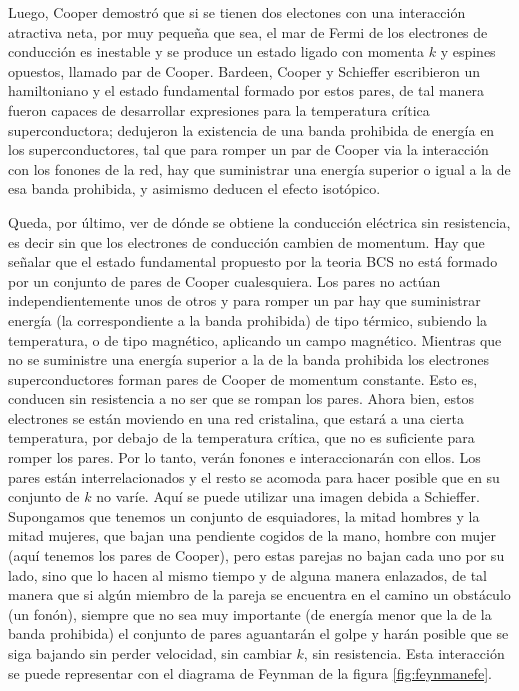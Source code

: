 Luego, Cooper demostró que si se tienen dos electones con una interacción atractiva neta, por muy pequeña que sea, el mar de Fermi de los electrones de conducción es inestable y se produce un estado ligado con momenta $k$ y espines opuestos, llamado par de Cooper. Bardeen, Cooper y Schieffer escribieron un hamiltoniano y el estado fundamental formado por estos pares, de tal manera fueron capaces de desarrollar expresiones para la temperatura crítica superconductora; dedujeron la existencia de una banda prohibida de energía en los superconductores, tal que para romper un par de Cooper via la interacción con los fonones de la red, hay que suministrar una energía superior o igual a la de esa banda prohibida, y asimismo deducen el efecto isotópico.

Queda, por último, ver de dónde se obtiene la conducción eléctrica sin resistencia, es decir sin que los electrones de conducción cambien de momentum. Hay que señalar que el estado fundamental propuesto por la teoria BCS no está formado por un conjunto de pares de Cooper cualesquiera. Los pares no actúan independientemente unos de otros y para romper un par hay que suministrar energía (la correspondiente a la banda prohibida) de tipo térmico, subiendo la temperatura, o de tipo magnético, aplicando un campo magnético. Mientras que no se suministre una energía superior a la de la banda prohibida los electrones superconductores forman pares de Cooper de momentum constante. Esto es, conducen sin resistencia a no ser que se rompan los pares. Ahora bien, estos electrones se están moviendo en una red cristalina, que estará a una cierta temperatura, por debajo de la temperatura crítica, que no es suficiente para romper los pares. Por lo tanto, verán fonones e interaccionarán con ellos. Los pares están interrelacionados y el resto se acomoda para hacer posible que en su conjunto de $k$ no varíe. Aquí se puede utilizar una imagen debida a Schieffer. Supongamos que tenemos un conjunto de esquiadores, la mitad hombres y la mitad mujeres, que bajan una pendiente cogidos de la mano, hombre con mujer (aquí tenemos los pares de Cooper), pero estas parejas no bajan cada uno por su lado, sino que lo hacen al mismo tiempo y de alguna manera enlazados, de tal manera que si algún miembro de la pareja se encuentra en el camino un obstáculo (un fonón), siempre que no sea muy importante (de energía menor que la de la banda prohibida) el conjunto de pares aguantarán el golpe y harán posible que se siga bajando sin perder velocidad, sin cambiar $k$, sin resistencia. Esta interacción se puede representar con el diagrama de Feynman de la figura \ref{fig:feynmanefe}.

